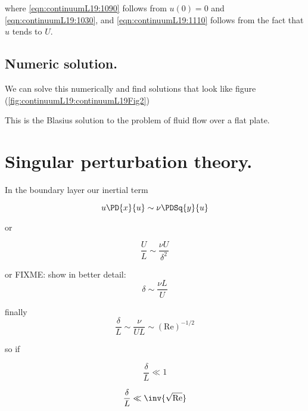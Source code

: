 where \ref{eqn:continuumL19:1090} follows from $u(0) = 0$ and \ref{eqn:continuumL19:1030}, and \ref{eqn:continuumL19:1110} follows from the fact that $u$ tends to $U$.

\subsection{Numeric solution.}

We can solve this numerically and find solutions that look like figure (\ref{fig:continuumL19:continuumL19Fig2})


This is the Blasius solution to the problem of fluid flow over a flat plate.

\section{Singular perturbation theory.}

In the boundary layer our inertial term

\begin{equation}\label{eqn:continuumL19:410}
u \PD{x}{u} \sim \nu \PDSq{y}{u}
\end{equation}

or

\begin{equation}\label{eqn:continuumL19:430}
\frac{U}{L} \sim \frac{\nu U}{\delta^2}
\end{equation}

or
FIXME: show in better detail:
\begin{equation}\label{eqn:continuumL19:450}
\delta  \sim \frac{\nu L}{U}
\end{equation}

finally
\begin{equation}\label{eqn:continuumL19:470}
\frac{\delta}{L} \sim \frac{\nu}{U L} \sim (\text{Re})^{-1/2}
\end{equation}

so if

\begin{equation}\label{eqn:continuumL19:490}
\frac{\delta}{L} \ll 1
\end{equation}

\begin{equation}\label{eqn:continuumL19:510}
\frac{\delta}{L} \ll \inv{\sqrt{\text{Re}}}
\end{equation}

